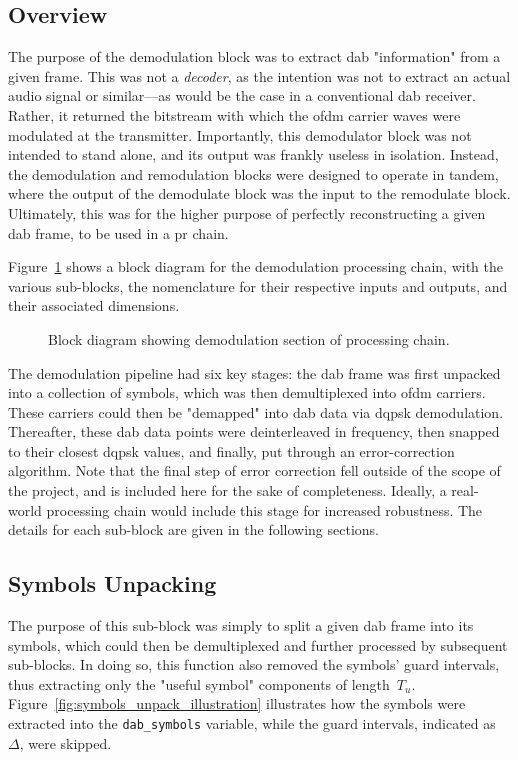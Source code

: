 \documentclass[class=report,11pt,crop=false]{standalone}
\begin{document}
\subsection{Overview}
The purpose of the demodulation block was to extract \gls{dab} "information" from a given frame. This was not a \emph{decoder}, as the intention was not to extract an actual audio signal or similar---as would be the case in a conventional \gls{dab} receiver. Rather, it returned the bitstream with which the \gls{ofdm} carrier waves were modulated at the transmitter. Importantly, this demodulator block was not intended to stand alone, and its output was frankly useless in isolation. Instead, the demodulation and remodulation blocks were designed to operate in tandem, where the output of the demodulate block was the input to the remodulate block. Ultimately, this was for the higher purpose of perfectly reconstructing a given \gls{dab} frame, to be used in a \gls{pr} chain.

Figure~\ref{fig:BD_Demod_All} shows a block diagram for the demodulation processing chain, with the various sub-blocks, the nomenclature for their respective inputs and outputs, and their associated dimensions.

\begin{figure}[htbp]
    \centering
    \captionsetup{type=figure}
    \def\svgwidth{\linewidth}
    { %
        }
    \caption{Block diagram showing demodulation section of processing chain.}
    \label{fig:BD_Demod_All}
\end{figure}

The demodulation pipeline had six key stages: the \gls{dab} frame was first unpacked into a collection of symbols, which was then demultiplexed into \gls{ofdm} carriers. These carriers could then be "demapped" into \gls{dab} data via \gls{dqpsk} demodulation. Thereafter, these \gls{dab} data points were deinterleaved in frequency, then snapped to their closest \gls{dqpsk} values, and finally, put through an error-correction algorithm. Note that the final step of error correction fell outside of the scope of the project, and is included here for the sake of completeness. Ideally, a real-world processing chain would include this stage for increased robustness. The details for each sub-block are given in the following sections.

\subsection{Symbols Unpacking \label{subsect:dab-proc_symbols-unpack}}
The purpose of this sub-block was simply to split a given \gls{dab} frame into its symbols, which could then be demultiplexed and further processed by subsequent sub-blocks. In doing so, this function also removed the symbols' guard intervals, thus extracting only the "useful symbol" components of length~\(T_u\). Figure~\ref{fig:symbols_unpack_illustration} illustrates how the symbols were extracted into the \texttt{dab\_symbols} variable, while the guard intervals, indicated as \(\Delta\), were skipped.
\end{document}
